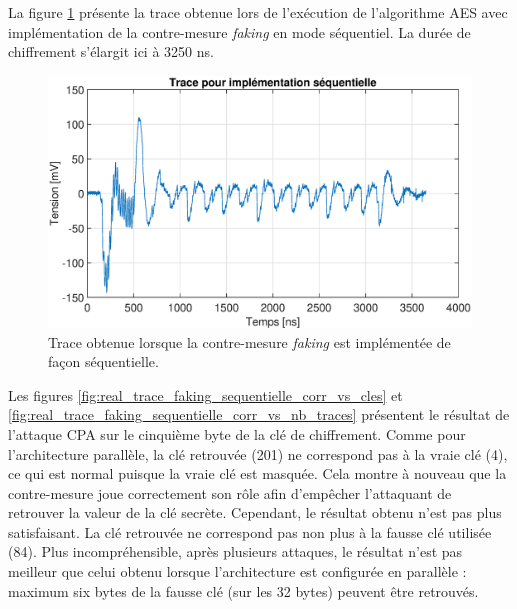 \documentclass[oneside]{book}
\begin{document}
La figure \ref{fig:real_trace_faking_sequentielle} présente la trace obtenue lors de l'exécution de l'algorithme AES avec implémentation de la contre-mesure \textit{faking} en mode séquentiel. La durée de chiffrement s'élargit ici à 3250 \si{\nano\second}.

\begin{figure}[htbp]
    \hspace{-1cm}
    \includegraphics[scale=0.53]{image/real_trace_faking_sequentielle}
    \caption{Trace obtenue lorsque la contre-mesure \textit{faking} est implémentée de façon séquentielle.}
    \label{fig:real_trace_faking_sequentielle} 
\end{figure}

Les figures \ref{fig:real_trace_faking_sequentielle_corr_vs_cles} et \ref{fig:real_trace_faking_sequentielle_corr_vs_nb_traces} présentent le résultat de l'attaque CPA sur le cinquième byte de la clé de chiffrement. Comme pour l'architecture parallèle, la clé retrouvée (201) ne correspond pas à la vraie clé (4), ce qui est normal puisque la vraie clé est masquée. Cela montre à nouveau que la contre-mesure joue correctement son rôle afin d'empêcher l'attaquant de retrouver la valeur de la clé secrète. Cependant, le résultat obtenu n'est pas plus satisfaisant. La clé retrouvée ne correspond pas non plus à la fausse clé utilisée (84). Plus incompréhensible, après plusieurs attaques, le résultat n'est pas meilleur que celui obtenu lorsque l'architecture est configurée en parallèle : maximum six bytes de la fausse clé (sur les 32 bytes) peuvent être retrouvés.
\end{document}
